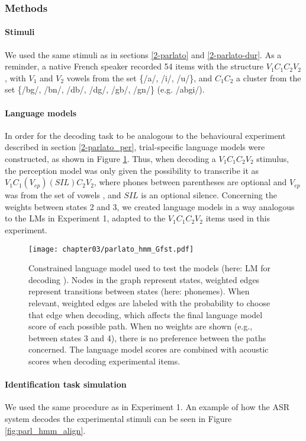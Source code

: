 {\subsubsection{Methods}
\paragraph{Stimuli}
We used the same stimuli as in sections \ref{2-parlato} and \ref{2-parlato-dur}. As a reminder, a native French speaker recorded 54 items with the structure $V_{1}C_{1}C_{2}V_{2}$, with $V_{1}$ and $V_{2}$ vowels from the set \{/a/, /i/, /u/\}, and $C_{1}C_{2}$ a cluster from the set \{/bg/, /bn/, /db/, /dg/, /gb/, /gn/\} (e.g. /abgi/).

\paragraph{Language models}

In order for the decoding task to be analogous to the behavioural experiment described in section \ref{2-parlato_per}, trial-specific language models were constructed, as shown in Figure \ref{fig:parlato_G}. Thus, when decoding a $V_{1}C_{1}C_{2}V_{2}$ stimulus, the perception model was only given the possibility to transcribe it as $V_{1}C_{1}(V_{ep})(SIL)C_{2}V_{2}$, where phones between parentheses are optional and $V_{ep}$ was from the set of vowels , and $SIL$ is an optional silence. Concerning the weights between states 2 and 3, we created language models in a way analogous to the LMs in Experiment 1, adapted to the $V_{1}C_{1}C_{2}V_{2}$ items used in this experiment.

\begin{figure}[htb]
\centering
\texttt{[image: chapter03/parlato\_hmm\_Gfst.pdf]}
\caption{Constrained language model used to test the models (here: LM for decoding ). Nodes in the graph represent states, weighted edges represent transitions between states (here: phonemes). When relevant, weighted edges are labeled with the probability to choose that edge when decoding, which affects the final language model score of each possible path. When no weights are shown (e.g., between states 3 and 4), there is no preference between the paths concerned. The language model scores are combined with acoustic scores when decoding experimental items.
}
\label{fig:parlato_G}
\end{figure}

\paragraph{Identification task simulation}
We used the same procedure as in Experiment 1. An example of how the ASR system decodes the experimental stimuli can be seen in Figure \ref{fig:parl_hmm_align}. 

}
